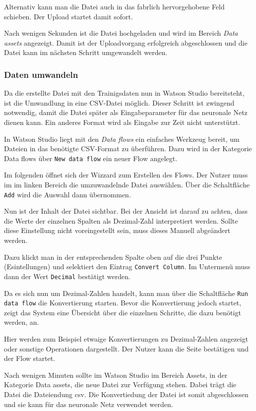 Alternativ kann man die Datei auch in das fabrlich hervorgehobene Feld schieben. Der Upload startet damit sofort.

Nach wenigen Sekunden ist die Datei hochgeladen und wird im Bereich \textit{Data assets} angezeigt. Damit ist der
Uploadvorgang erfolgreich abgeschlossen und die Datei kann im nächsten Schritt umgewandelt werden.

\subsubsection{Daten umwandeln}
Da die erstellte Datei mit den Trainigsdaten nun in Watson Studio bereitsteht, ist die Umwandlung in eine CSV-Datei
möglich. Dieser Schritt ist zwingend notwendig, damit die Datei später als Eingabeparameter für das neuronale Netz dienen
kann. Ein anderes Format wird als Eingabe zur Zeit nicht unterstützt.

In Watson Studio liegt mit den \textit{Data flows} ein einfaches Werkzeug bereit, um Dateien in das benötigte CSV-Format
zu überführen. Dazu wird in der Kategorie Data flows über \texttt{New data flow} ein neuer Flow angelegt.

Im folgenden öffnet sich der Wizzard zum Erstellen des Flows. Der Nutzer muss im im linken Bereich die umzuwandelnde Datei
auswählen. Über die Schaltfläche \texttt{Add} wird die Auswahl dann übernommen.

Nun ist der Inhalt der Datei sichtbar. Bei der Ansicht ist darauf zu achten, dass die Werte der einzelnen Spalten als
Dezimal-Zahl interpretiert werden. Sollte diese Einstellung nicht voreingestellt sein, muss dieses Manuell abgeändert
werden.

Dazu klickt man in der entsprechenden Spalte oben auf die drei Punkte (Esintellungen) und selektiert den Eintrag
\texttt{Convert Column}. Im Untermenü muss dann der Wert \texttt{Decimal} bestätigt werden.

Da es sich nun um Dezimal-Zahlen handelt, kann man über die Schaltfläche \texttt{Run data flow} die Konvertierung starten.
Bevor die Konvertierung jedoch startet, zeigt das System eine Übersicht über die einzelnen Schritte, die dazu benötigt
werden, an.

Hier werden zum Beispiel etwaige Konvertierungen zu Dezimal-Zahlen angezeigt oder sonstige Operationen dargestellt. Der
Nutzer kann die Seite bestätigen und der Flow startet.

Nach wenigen Minuten sollte im Watson Studio im Bereich Assets, in der Kategorie Data assets, die neue Datei zur Verfügung
stehen. Dabei trägt die Datei die Dateiendung csv. Die Konvertiedung der Datei ist somit abgeschlossen und sie kann für
das neuronale Netz verwendet werden.


